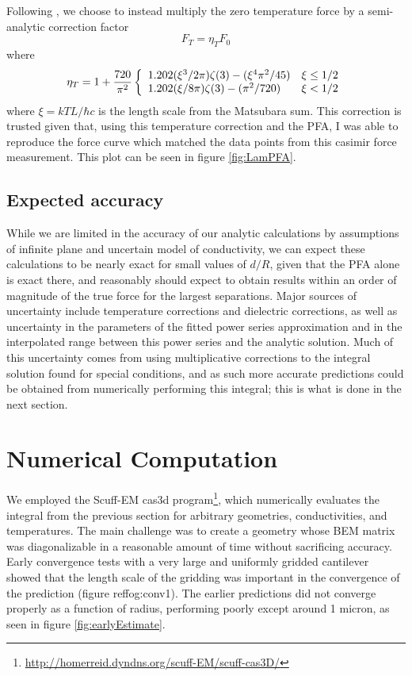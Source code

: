 \documentclass[11pt,traditabstract]{article}
\begin{document}
Following \citet{Lamoreaux}, we choose to instead multiply the zero temperature force by a semi-analytic correction factor 
$$
F_T=\eta_TF_0
$$
where
$$
\eta_T=1+\frac{720}{\pi^2}\left\{\begin{array}{l r}
1.202(\xi^3/2\pi)\zeta(3)-(\xi^4\pi^2/45)&\xi\le1/2 \\
1.202(\xi/8\pi)\zeta(3)-(\pi^2/720)&\xi < 1/2
\end{array}\right.
$$
where $\xi=kTL/\hbar c$ is the length scale from the Matsubara sum. This correction is trusted given that, using this temperature correction and the PFA, I was able to reproduce the force curve which matched the data points from this casimir force measurement. This plot can be seen in figure \ref{fig:LamPFA}.

\subsection{Expected accuracy}
While we are limited in the accuracy of our analytic calculations by assumptions of infinite plane and uncertain model of conductivity, we can expect these calculations to be nearly exact for small values of $d/R$, given that the PFA alone is exact there, and reasonably should expect to obtain results within an order of magnitude of the true force for the largest separations. Major sources of uncertainty include temperature corrections and dielectric corrections, as well as uncertainty in the parameters of the fitted power series approximation and in the interpolated range between this power series and the analytic solution. Much of this uncertainty comes from using multiplicative corrections to the integral solution found for special conditions, and as such more accurate predictions could be obtained from numerically performing this integral; this is what is done in the next section.

\section{Numerical Computation}

We employed the Scuff-EM cas3d program\footnote{\url{http://homerreid.dyndns.org/scuff-EM/scuff-cas3D/}}\citep{Cas3DPRL,Cas3DPRA}, which numerically evaluates the integral from the previous section for arbitrary geometries, conductivities, and temperatures. The main challenge was to create a geometry whose BEM matrix was diagonalizable in a reasonable amount of time without sacrificing accuracy. Early convergence tests with a very large and uniformly gridded cantilever showed that the length scale of the gridding was important in the convergence of the prediction (figure ref{fog:conv1}). The earlier predictions did not converge properly as a function of radius, performing poorly except around 1 micron, as seen in figure \ref{fig:earlyEstimate}. 
\end{document}
